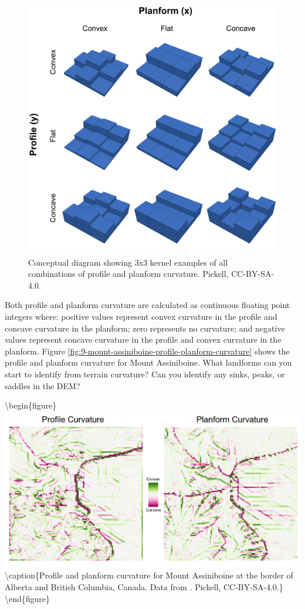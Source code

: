 \documentclass[
]{book}
\begin{document}
\begin{figure}
\includegraphics[width=0.75\linewidth]{images/09-stacked-profile-planform-kernel} \caption{Conceptual diagram showing 3x3 kernel examples of all combinations of profile and planform curvature. Pickell, CC-BY-SA-4.0.}\label{fig:9-stacked-profile-planform-kernel}
\end{figure}

Both profile and planform curvature are calculated as continuous floating point integers where: positive values represent convex curvature in the profile and concave curvature in the planform; zero represents no curvature; and negative values represent concave curvature in the profile and convex curvature in the planform. Figure \ref{fig:9-mount-assiniboine-profile-planform-curvature} shows the profile and planform curvature for Mount Assiniboine. What landforms can you start to identify from terrain curvature? Can you identify any sinks, peaks, or saddles in the DEM?

\textbackslash begin\{figure\}
\includegraphics[width=0.75\linewidth]{images/09-mount-assiniboine-profile-planform-curvature} \textbackslash caption\{Profile and planform curvature for Mount Assiniboine at the border of Alberta and British Columbia, Canada. Data from \citet{natural_resources_canada_canadian_2015}. Pickell, CC-BY-SA-4.0.\}\label{fig:9-mount-assiniboine-profile-planform-curvature}
\textbackslash end\{figure\}
\end{document}
